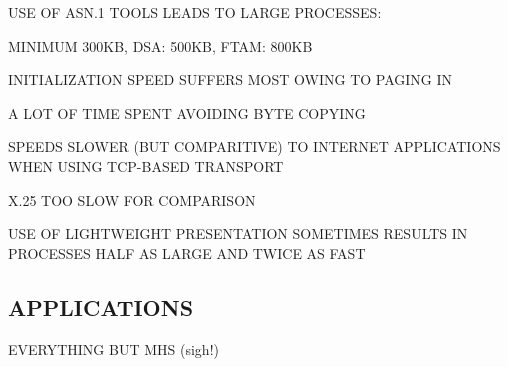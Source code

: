 

\begin{bwslide}

\begin{nrtc}
\item	USE OF ASN.1 TOOLS LEADS TO LARGE PROCESSES:
    \begin{nrtc}
    \item	MINIMUM 300KB, DSA: 500KB, FTAM: 800KB

    \item	INITIALIZATION SPEED SUFFERS MOST OWING TO PAGING IN
    \end{nrtc}

\item	A LOT OF TIME SPENT AVOIDING BYTE COPYING

\item	SPEEDS SLOWER (BUT COMPARITIVE) TO INTERNET APPLICATIONS WHEN USING
	TCP-BASED TRANSPORT

\item	X.25 TOO SLOW FOR COMPARISON

\item	USE OF LIGHTWEIGHT PRESENTATION SOMETIMES RESULTS IN PROCESSES HALF
	AS LARGE AND TWICE AS FAST
\end{nrtc}
\end{bwslide}


\begin{bwslide}
\part*	{APPLICATIONS}\bf

\begin{nrtc}
\item	EVERYTHING BUT MHS (sigh!)
\end{nrtc}
\end{bwslide}


